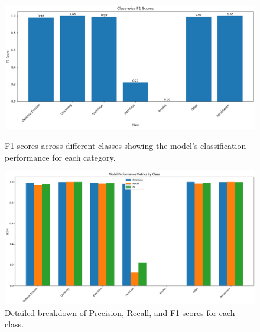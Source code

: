         \begin{figure}[h]
            \centering
            \begin{minipage}[c]{0.47\textwidth}
                \centering
                \vspace{0.25cm}
                \includegraphics[width=\textwidth]{../figures/plots/section4/f1_scores.png}
                \caption{F1 scores across different classes showing the model's classification performance for each category.}
                \label{fig:f1_scores}
            \end{minipage}
            \hfill
            \begin{minipage}[c]{0.47\textwidth}
                \centering
                \includegraphics[width=\textwidth]{../figures/plots/section4/performance_metrics.png}
                \caption{Detailed breakdown of Precision, Recall, and F1 scores for each class.}
                \label{fig:performance_metrics}
            \end{minipage}
        \end{figure}
        
        \vspace{-0.5cm}
        
